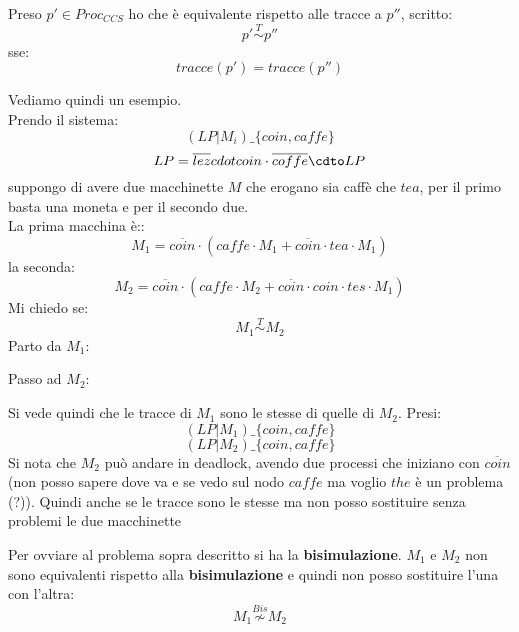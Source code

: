 \documentclass[a4paper,12pt, oneside]{book}
\begin{document}
\begin{teorema}
  Preso $p'\in Proc_{CCS}$ ho che è equivalente rispetto alle tracce a $p''$,
  scritto:
  \[p'\stackrel{T}{\sim} p''\]
  sse:
  \[tracce(p')=tracce(p'')\]
\end{teorema}
\begin{esempio}
  Vediamo quindi un esempio.\\
  Prendo il sistema:
  \[(LP|M_i)\_{\{coin,caffe\}}\]
  \[LP=\overline{lez}\\cdot coin\cdot \overline{coffe}\cdto LP\]
  suppongo di avere due macchinette $M$ che erogano sia caffè che $tea$, per il
  primo basta una moneta e per il secondo due.\\
  La prima macchina è::
  \[M_1=\overline{coin}\cdot(caffe\cdot M_1+\overline{coin}\cdot tea\cdot M_1)\]
  la seconda:
  \[M_2=\overline{coin}\cdot(caffe\cdot M_2+\overline{coin}\cdot coin \cdot
    tes\cdot M_1)\]
  Mi chiedo se:
  \[M_1\stackrel{T}{\sim} M_2\]
  \newpage
  Parto da $M_1$:
  \begin{center}
  \end{center}
  Passo ad $M_2$:
   \begin{center}
  \end{center}
  Si vede quindi che le tracce di $M_1$ sono le stesse di quelle di $M_2$.
  Presi:
  \[(LP|M_1)\_{\{coin,caffe\}}\]
  \[(LP|M_2)\_{\{coin,caffe\}}\]
  Si nota che $M_2$ può andare in deadlock, avendo due processi che iniziano con
  $\overline{coin}$ (non posso sapere dove va e se vedo sul nodo $caffe$ ma
  voglio $the$ è un problema (?)). Quindi anche se le tracce sono le stesse ma
  non posso sostituire senza problemi le due macchinette

\end{esempio}
Per ovviare al problema sopra descritto si ha la \textbf{bisimulazione}. $M_1$ e
$M_2$ non sono equivalenti rispetto alla \textbf{bisimulazione} e quindi non
posso sostituire l'una con l'altra:
\[M_1\stackrel{Bis}{\not\sim}M_2\]
\end{document}
